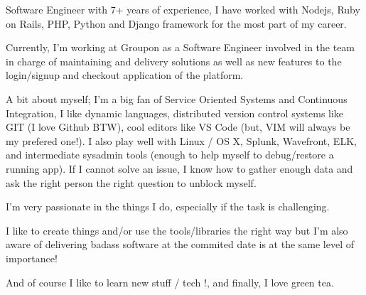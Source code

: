 

\begin{cvparagraph}

Software Engineer with 7+ years of experience, I have worked with Nodejs, Ruby on Rails, PHP, Python and Django framework for the most part of my career.

Currently, I'm working at Groupon as a Software Engineer involved in the team in charge of maintaining and delivery solutions as well as new features to the login/signup and checkout application of the platform.

A bit about myself; I'm a big fan of Service Oriented Systems and Continuous Integration, I like dynamic languages, distributed version control systems like GIT (I love Github BTW), cool editors like VS Code (but, VIM will always be my prefered one!). I also play well with Linux / OS X, Splunk, Wavefront, ELK, and intermediate sysadmin tools (enough to help myself to debug/restore a running app). If I cannot solve an issue, I know how to gather enough data and ask the right person the right question to unblock myself.

I'm very passionate in the things I do, especially if the task is challenging.

I like to create things and/or use the tools/libraries the right way but I'm also aware of delivering badass software at the commited date is at the same level of importance!

And of course I like to learn new stuff / tech !, and finally, I love green tea.
\end{cvparagraph}
